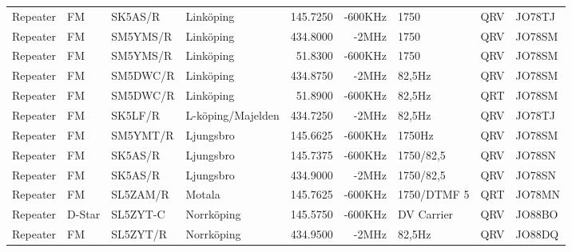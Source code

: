 \begin{landscape}
\begin{longtable}{llllrrlcl}
	Repeater                  & FM            & SK5AS/R       & Linköping           & 145.7250          & -600KHz        & 1750             & QRV             & JO78TJ           \\
	Repeater                  & FM            & SM5YMS/R      & Linköping           & 434.8000          & -2MHz          & 1750             & QRV             & JO78SM           \\
	Repeater                  & FM            & SM5YMS/R      & Linköping           & 51.8300           & -600KHz        & 1750             & QRV             & JO78SM           \\
	Repeater                  & FM            & SM5DWC/R      & Linköping           & 434.8750          & -2MHz          & 82,5Hz           & QRV             & JO78SM           \\
	Repeater                  & FM            & SM5DWC/R      & Linköping           & 51.8900           & -600KHz        & 82,5Hz           & QRT             & JO78SM           \\
	Repeater                  & FM            & SK5LF/R       & L-köping/Majelden   & 434.7250          & -2MHz          & 82,5Hz           & QRV             & JO78TJ           \\
	Repeater                  & FM            & SM5YMT/R      & Ljungsbro           & 145.6625          & -600KHz        & 1750Hz           & QRV             & JO78SM           \\
	Repeater                  & FM            & SK5AS/R       & Ljungsbro           & 145.7375          & -600KHz        & 1750/82,5        & QRV             & JO78SN           \\
	Repeater                  & FM            & SK5AS/R       & Ljungsbro           & 434.9000          & -2MHz          & 1750/82,5        & QRV             & JO78SN           \\
	Repeater                  & FM            & SL5ZAM/R      & Motala              & 145.7625          & -600KHz        & 1750/DTMF 5      & QRT             & JO78MN           \\
	Repeater                  & D-Star        & SL5ZYT-C      & Norrköping          & 145.5750          & -600KHz        & DV Carrier       & QRV             & JO88BO           \\
	Repeater                  & FM            & SL5ZYT/R      & Norrköping          & 434.9500          & -2MHz          & 82,5Hz           & QRV             & JO88DQ           \\

\end{longtable}
\end{landscape}
